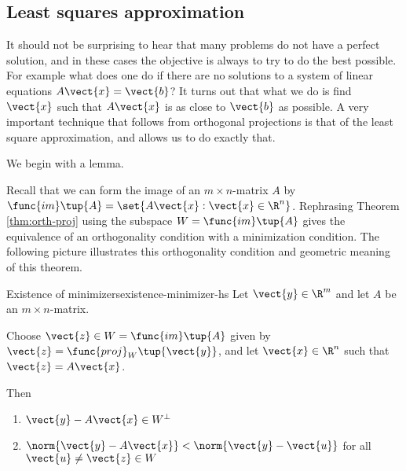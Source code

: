 \subsection{Least squares approximation}

It should not be surprising to hear that many problems do not have a
perfect solution, and in these cases the objective is always to try to
do the best possible. For example what does one do if there are no
solutions to a system of linear equations $A\vect{x}=\vect{b}$? It
turns out that what we do is find $\vect{x}$ such that $A\vect{x}$ is
as close to $\vect{b}$ as possible. A very important technique that
follows from orthogonal projections is that of the least square
approximation, and allows us to do
exactly that.

We begin with a lemma. 

Recall that we can form the image of an $m \times n$-matrix $A$ by
$\func{im}\tup{A} = \set{A\vect{x} : \vect{x} \in
\R^n }$. Rephrasing Theorem \ref{thm:orth-proj} using
the subspace $W=\func{im}\tup{A}$  gives the
equivalence of an orthogonality condition with a minimization
condition. The following picture
illustrates this orthogonality condition and geometric meaning of this
theorem.

\begin{center}
\end{center}

\begin{theorem}{Existence of minimizers}{existence-minimizer-hs}\label{existence-minimizer-hs}
Let $\vect{y}\in \R^{m}$ and let $A$ be an $m\times n$-matrix.

Choose $\vect{z}\in W= \func{im}\tup{A}$ given by $\vect{z} =
\func{proj}_{W}\tup{\vect{y}}$, and let $\vect{x} \in \R^{n}$ such that $\vect{z}=A\vect{x}$.

Then
\begin{enumerate}
\item $\vect{y} - A\vect{x} \in W^{\perp}$
\item $\norm{\vect{y} - A\vect{x}} < \norm{\vect{y} - \vect{u}}$ for all $\vect{u} \neq \vect{z} \in W$
\end{enumerate}
\end{theorem}

